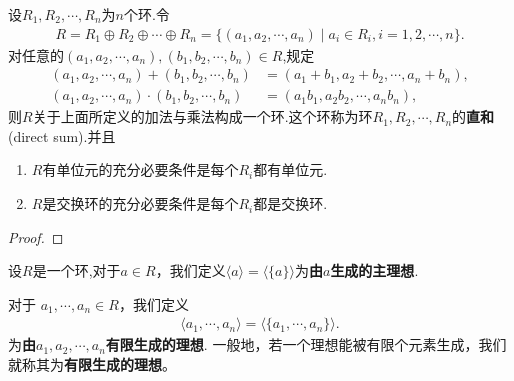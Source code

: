 \documentclass[../../main.tex]{subfiles}%
\begin{document}
\begin{theorem}
设$R_1,R_2,\cdots,R_n$为$n$个环.令
\begin{align*}
R = R_1 \oplus R_2 \oplus \cdots \oplus R_n = \{(a_1,a_2,\cdots,a_n) \mid a_i \in R_i, i=1,2,\cdots,n\}.
\end{align*}
对任意的$(a_1,a_2,\cdots,a_n),(b_1,b_2,\cdots,b_n) \in R$,规定
\begin{align*}
(a_1,a_2,\cdots,a_n) + (b_1,b_2,\cdots,b_n) &= (a_1 + b_1,a_2 + b_2,\cdots,a_n + b_n), \\
(a_1,a_2,\cdots,a_n) \cdot (b_1,b_2,\cdots,b_n) &= (a_1b_1,a_2b_2,\cdots,a_nb_n),
\end{align*}
则$R$关于上面所定义的加法与乘法构成一个环.这个环称为环$R_1,R_2,\cdots,R_n$的\textbf{直和}(direct sum).并且
\begin{enumerate}[(1)]
\item $R$有单位元的充分必要条件是每个$R_i$都有单位元.

\item $R$是交换环的充分必要条件是每个$R_i$都是交换环.
\end{enumerate}
\end{theorem}
\begin{proof}



\end{proof}

\begin{definition}
设$R$是一个环,对于$a\in R$，我们定义$\langle a\rangle=\langle \{a\} \rangle$为\textbf{由$a$生成的主理想}.

对于 $a_1, \cdots, a_n \in R$，我们定义
\begin{align*}
\langle a_1, \cdots, a_n\rangle = \langle\{a_1, \cdots, a_n\}\rangle.
\end{align*}
为\textbf{由$a_1,a_2,\cdots,a_n$有限生成的理想}.
一般地，若一个理想能被有限个元素生成，我们就称其为\textbf{有限生成的理想}。 
\end{definition}
\end{document}
